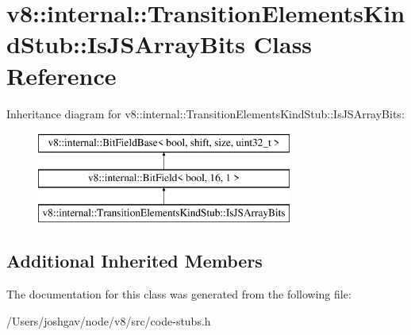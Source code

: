 \hypertarget{classv8_1_1internal_1_1_transition_elements_kind_stub_1_1_is_j_s_array_bits}{}\section{v8\+:\+:internal\+:\+:Transition\+Elements\+Kind\+Stub\+:\+:Is\+J\+S\+Array\+Bits Class Reference}
\label{classv8_1_1internal_1_1_transition_elements_kind_stub_1_1_is_j_s_array_bits}
Inheritance diagram for v8\+:\+:internal\+:\+:Transition\+Elements\+Kind\+Stub\+:\+:Is\+J\+S\+Array\+Bits\+:\begin{figure}[H]
\begin{center}
\leavevmode
\includegraphics[height=3.000000cm]{classv8_1_1internal_1_1_transition_elements_kind_stub_1_1_is_j_s_array_bits}
\end{center}
\end{figure}
\subsection*{Additional Inherited Members}


The documentation for this class was generated from the following file\+:\begin{DoxyCompactItemize}
\item 
/\+Users/joshgav/node/v8/src/code-\/stubs.\+h\end{DoxyCompactItemize}
